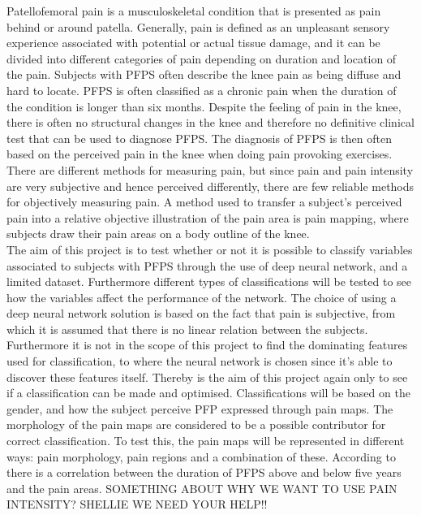 Patellofemoral pain is a musculoskeletal condition that is presented as pain behind or around patella. Generally, pain is defined as an unpleasant sensory experience associated with potential or actual tissue damage, and it can be divided into different categories of pain depending on duration and location of the pain. Subjects with PFPS often describe the knee pain as being diffuse and hard to locate. PFPS is often classified as a chronic pain when the duration of the condition is longer than six months. Despite the feeling of pain in the knee, there is often no structural changes in the knee and therefore no definitive clinical test that can be used to diagnose PFPS. The diagnosis of PFPS is then often based on the perceived pain in the knee when doing pain provoking exercises. There are different methods for measuring pain, but since pain and pain intensity are very subjective and hence perceived differently, there are few reliable methods for objectively measuring pain. A method used to transfer a subject’s perceived pain into a relative objective illustration of the pain area is pain mapping, where subjects draw their pain areas on a body outline of the knee.\\

\noindent
The aim of this project is to test whether or not it is possible to classify variables associated to subjects with PFPS through the use of deep neural network, and a limited dataset. Furthermore different types of classifications will be tested to see how the variables affect the performance of the network.   
The choice of using a deep neural network solution is based on the fact that pain is subjective, from which it is assumed that there is no linear relation between the subjects. Furthermore it is not in the scope of this project to find the dominating features used for classification, to where the neural network is chosen since it's able to discover these features itself. Thereby is the aim of this project again only to see if a classification can be made and optimised. 
Classifications will be based on the gender, and how the subject perceive PFP expressed through pain maps. The morphology of the pain maps are considered to be a possible contributor for correct classification. To test this, the pain maps will be represented in different ways: pain morphology, pain regions and a combination of these.
According to \citeauthor{Boudreau2017} there is a correlation between the duration of PFPS above and below five years and the pain areas. SOMETHING ABOUT WHY WE WANT TO USE PAIN INTENSITY? SHELLIE WE NEED YOUR HELP!! 

